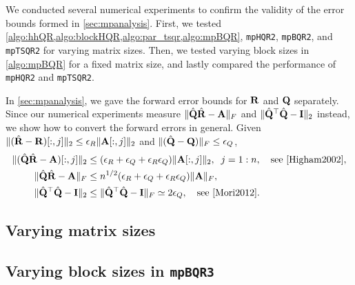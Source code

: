 We conducted several numerical experiments to confirm the validity of the error bounds formed in \cref{sec:mpanalysis}.
First, we tested \cref{algo:hhQR,algo:blockHQR,algo:par_tsqr,algo:mpBQR}, {\tt mpHQR2}, {\tt mpBQR2}, and {\tt mpTSQR2} for varying matrix sizes.
Then, we tested varying block sizes in \cref{algo:mpBQR} for a fixed matrix size, and lastly compared the performance of {\tt mpHQR2} and {\tt mpTSQR2}.\par

In \cref{sec:mpanalysis}, we gave the forward error bounds for $\mathbf{R}$ and $\mathbf{Q}$ separately. 
Since our numerical experiments measure $\|\hat{\mathbf{Q}}\hat{\mathbf{R}}-\mathbf{A}\|_F$ and $\|\hat{\mathbf{Q}}^{\top}\hat{\mathbf{Q}}-\mathbf{I}\|_2$ instead, we show how to convert the forward errors in general.
Given $\|(\hat{\mathbf{R}}-\mathbf{R})[:,j]\|_2\leq \epsilon_R \|\mathbf{A}[:,j]\|_2$ and $\|(\hat{\mathbf{Q}}-\mathbf{Q})\|_F\leq \epsilon_Q$,
\begin{align}
	\|(\hat{\bb{Q}}\hat{\bb{R}}-\bb{A})[:,j]\|_2 &\leq (\epsilon_R+\epsilon_Q + \epsilon_R\epsilon_Q)\|\bb{A}[:,j]\|_2,\;\; j=1:n,\quad \text{see \cite{Higham2002}},\\
	\|\hat{\bb{Q}}\hat{\bb{R}}-\bb{A}\|_F &\leq n^{1/2}(\epsilon_R+\epsilon_Q + \epsilon_R\epsilon_Q)\|\bb{A}\|_F, \label{eqn:QRA} \\
	\|\hat{\bb{Q}}^{\top}\hat{\bb{Q}}-\bb{I}\|_2 &\leq \|\hat{\bb{Q}}^{\top}\hat{\bb{Q}}-\bb{I}\|_F \simeq 2\epsilon_Q,\quad\text{see \cite{Mori2012}} \label{eqn:QQI}.
\end{align}
\subsection{Varying matrix sizes}
\subsection{Varying block sizes in {\tt mpBQR3}}
